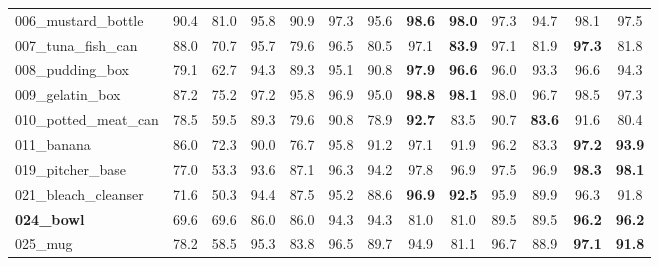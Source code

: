 \documentclass[letterpaper, 10 pt, conference]{ieeeconf}
\begin{document}
\begin{table*}[t]
\begin{center}
{\begin{tabular}{l|c|c|c|c|c|c||c|c|c|c|c|c}
006\_mustard\_bottle               & 90.4 & 81.0                  & 95.8 & 90.9                      & 97.3 & 95.6                    & \textbf{98.6} & \textbf{98.0}  & 97.3           & 94.7            & 98.1           & 97.5           \\
007\_tuna\_fish\_can               & 88.0 & 70.7                  & 95.7 & 79.6                      & 96.5 & 80.5                    & 97.1           & \textbf{83.9}  & 97.1           & 81.9            & \textbf{97.3}  & 81.8           \\
008\_pudding\_box                  & 79.1 & 62.7                  & 94.3 & 89.3                      & 95.1 & 90.8                    & \textbf{97.9} & \textbf{96.6}  & 96.0           & 93.3            & 96.6           & 94.3           \\
009\_gelatin\_box                  & 87.2 & 75.2                  & 97.2 & 95.8                      & 96.9 & 95.0                    & \textbf{98.8} & \textbf{98.1}  & 98.0           & 96.7            & 98.5           & 97.3           \\
010\_potted\_meat\_can             & 78.5 & 59.5                  & 89.3 & 79.6                      & 90.8 & 78.9                    & \textbf{92.7} & 83.5            & 90.7           & \textbf{83.6}   & 91.6           & 80.4           \\
011\_banana                        & 86.0 & 72.3                  & 90.0 & 76.7                      & 95.8 & 91.2                    & 97.1           & 91.9            & 96.2           & 83.3            & \textbf{97.2}  & \textbf{93.9}  \\
019\_pitcher\_base                 & 77.0 & 53.3                  & 93.6 & 87.1                      & 96.3 & 94.2                    & 97.8           & 96.9            & 97.5           & 96.9            & \textbf{98.3}  & \textbf{98.1}  \\
021\_bleach\_cleanser              & 71.6 & 50.3                  & 94.4 & 87.5                      & 95.2 & 88.6                    & \textbf{96.9} & \textbf{92.5}   & 95.9           & 89.9            & 96.3           & 91.8           \\
\textbf{024\_bowl}                & 69.6 & 69.6                  & 86.0 & 86.0                      & 94.3 & 94.3                    & 81.0           & 81.0            & 89.5           & 89.5            & \textbf{96.2}  & \textbf{96.2}  \\
025\_mug                           & 78.2 & 58.5                  & 95.3 & 83.8                      & 96.5 & 89.7                    & 94.9           & 81.1            & 96.7           & 88.9            & \textbf{97.1}  & \textbf{91.8}  \\

\end{tabular}}
\end{center}
\end{table*}
\end{document}
